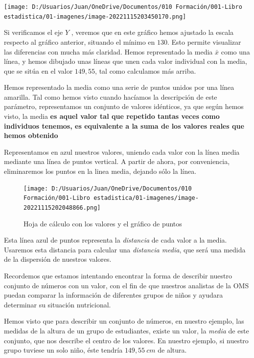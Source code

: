 \documentclass[
  letterpaper,
  DIV=11,
  numbers=noendperiod,
  oneside]{scrreprt}
\begin{document}
\texttt{[image: D:/Usuarios/Juan/OneDrive/Documentos/010 Formación/001-Libro estadistica/01-imagenes/image-20221115203450170.png]}

Si verificamos el eje \(Y\) , veremos que en este gráfico hemos ajustado
la escala respecto al gráfico anterior, situando el mínimo en \(130\).
Esto permite visualizar las diferencias con mucha más claridad. Hemos
representado la media \(\bar{x}\) como una línea, y hemos dibujado unas
líneas que unen cada valor individual con la media, que se sitúa en el
valor \(149,55\), tal como calculamos más arriba.

Hemos representado la media como una serie de puntos unidos por una
línea amarilla. Tal como hemos visto cuando hacíamos la descripción de
este parámetro, representamos un conjunto de valores idénticos, ya que
según hemos visto, la media \textbf{es aquel valor tal que repetido
tantas veces como individuos tenemos, es equivalente a la suma de los
valores reales que hemos obtenido}

Representamos en azul nuestros valores, uniendo cada valor con la línea
media mediante una línea de puntos vertical. A partir de ahora, por
conveniencia, eliminaremos los puntos en la linea media, dejando sólo la
línea.

\begin{figure}

{\centering \texttt{[image: D:/Usuarios/Juan/OneDrive/Documentos/010 Formación/001-Libro estadistica/01-imagenes/image-20221115202048866.png]}

}

\caption{Hoja de cálculo con los valores y el gráfico de puntos}

\end{figure}

Esta línea azul de puntos representa la \emph{distancia} de cada valor a
la media. Usaremos esta distancia para calcular una \emph{distancia
media}, que será una medida de la dispersión de nuestros valores.

Recordemos que estamos intentando encontrar la forma de describir
nuestro conjunto de números con un valor, con el fin de que nuestros
analistas de la OMS puedan comparar la información de diferentes grupos
de niños y ayudara determinar su situación nutricional.

Hemos visto que para describir un conjunto de números, en nuestro
ejemplo, las medidas de la altura de un grupo de estudiantes, existe un
valor, la \emph{media} de este conjunto, que nos describe el centro de
los valores. En nuestro ejemplo, si nuestro grupo tuviese un solo niño,
éste tendría \(149,55{\ }cm\) de altura.
\end{document}
